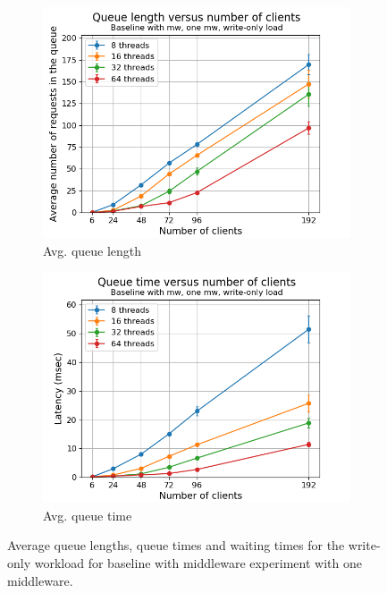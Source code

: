 \documentclass[11pt,a4paper]{article}
\begin{document}
\begin{figure}[h]
\centering
\begin{subfigure}{.5\textwidth}
  \centering
  \includegraphics[width=1.0\linewidth,trim={0px 0px 0px 0px},clip]{img/plot/mwb1-wo-qlen_mw.png}
  \caption{Avg. queue length}
  \label{fig:mwb1-wo-qlen_mw}
\end{subfigure}%
\begin{subfigure}{.5\textwidth}
  \centering
  \includegraphics[width=1.0\linewidth,trim={0px 0px 0px 0px},clip]{img/plot/mwb1-wo-qtime_mw.png}
  \caption{Avg. queue time}
  \label{fig:mwb1-wo-qtime_mw}
\end{subfigure}
\caption{Average queue lengths, queue times and waiting times for the write-only workload for baseline with middleware experiment with one middleware.}
\label{fig:mwb1-wo-qstats}
\end{figure}
\end{document}

